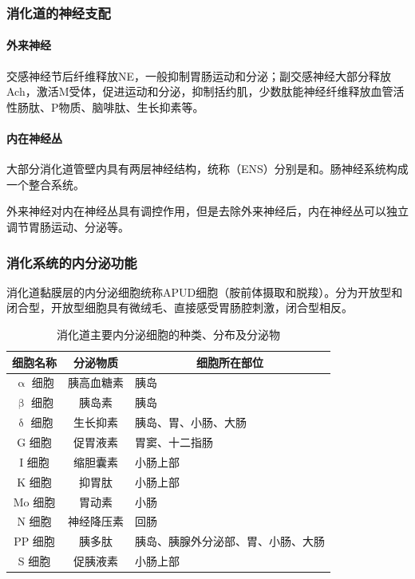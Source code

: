 \subsubsection{消化道的神经支配}

\paragraph{外来神经}

交感神经节后纤维释放NE，一般抑制胃肠运动和分泌；副交感神经大部分释放Ach，激活M受体，促进运动和分泌，抑制括约肌，少数肽能神经纤维释放血管活性肠肽、P物质、脑啡肽、生长抑素等。

\paragraph{内在神经丛}

大部分消化道管壁内具有两层神经结构，统称（ENS）分别是和。肠神经系统构成一个整合系统。

外来神经对内在神经丛具有调控作用，但是去除外来神经后，内在神经丛可以独立调节胃肠运动、分泌等。


\subsubsection{消化系统的内分泌功能}

消化道黏膜层的内分泌细胞统称APUD细胞（胺前体摄取和脱羧）。分为开放型和闭合型，开放型细胞具有微绒毛、直接感受胃肠腔刺激，闭合型相反。

\begin{table}[htbp]
	\centering
	\begin{tabularx}{\textwidth}{|c|c|X|}
		\hline
		细胞名称 & 分泌物质 & \multicolumn{1}{c|}{细胞所在部位} \\
		\hline
		$\upalpha$ 细胞 & 胰高血糖素 & 胰岛 \\
		\hline
		$\upbeta$ 细胞 & 胰岛素 & 胰岛 \\
		\hline
		$\updelta$ 细胞 & 生长抑素 & 胰岛、胃、小肠、大肠 \\
		\hline
		G 细胞 & 促胃液素 & 胃窦、十二指肠 \\
		\hline
		I 细胞 & 缩胆囊素 & 小肠上部 \\
		\hline
		K 细胞 & 抑胃肽 & 小肠上部 \\
		\hline
		Mo 细胞 & 胃动素 & 小肠 \\
		\hline
		N 细胞 & 神经降压素 & 回肠 \\
		\hline
		PP 细胞 & 胰多肽 & 胰岛、胰腺外分泌部、胃、小肠、大肠 \\
		\hline
		S 细胞 & 促胰液素 & 小肠上部 \\
		\hline
	\end{tabularx}
	\caption{消化道主要内分泌细胞的种类、分布及分泌物}
	\label{tab:gut-endocrine-cells}
\end{table}

